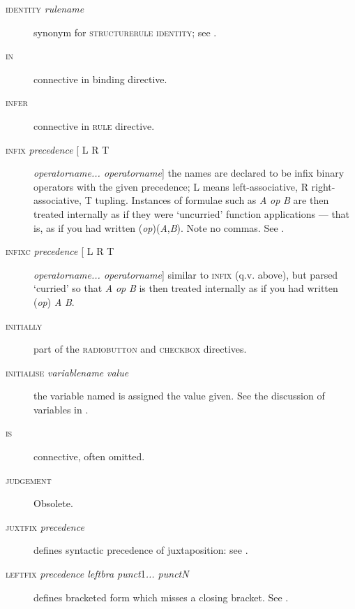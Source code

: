 \begin{description}
\item[\textsc{identity} \textit{rulename}] synonym for \textsc{structurerule} \textsc{identity}; see .

\item[\textsc{in}] connective in binding directive.

\item[\textsc{infer}] connective in \textsc{rule} directive.

\item[\textsc{infix} \textit{precedence} [ L {\textbar} R {\textbar} T ] \textit{operatorname... operatorname}] the names are declared to be infix binary operators with the given precedence; L means left-associative, R right-associative, T tupling. Instances of formulae such as \textit{A} \textit{op} \textit{B} are then treated internally as if they were `uncurried' function applications --- that is, as if you had written (\textit{op})(\textit{A},\textit{B}). Note no commas. See .

\item[\textsc{infixc} \textit{precedence} [ L {\textbar} R {\textbar} T ] \textit{operatorname... operatorname}] similar to \textsc{infix} (q.v. above), but parsed `curried' so that \textit{A} \textit{op} \textit{B} is then treated internally as if you had written (\textit{op}) \textit{A} \textit{B}.

\item[\textsc{initially}] part of the \textsc{radiobutton} and \textsc{checkbox} directives.

\item[\textsc{initialise} \textit{variablename} \textit{value}] the variable named is assigned the value given. See the discussion of variables in .

\item[\textsc{is}] connective, often omitted.

\item[\textsc{judgement}] Obsolete.

\item[\textsc{juxtfix} \textit{precedence}] defines syntactic precedence of juxtaposition: see .

\item[\textsc{leftfix} \textit{precedence leftbra punct}1\textit{... punctN}] defines bracketed form which misses a closing bracket. See .


\end{description}
